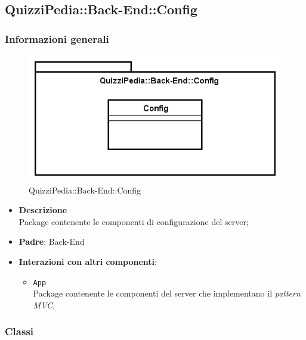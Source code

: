 \subsection{QuizziPedia::Back-End::Config}
\subsubsection{Informazioni generali}
\label{QuizziPedia::Back-End::Config}
\begin{figure}[ht]
	\centering
	\includegraphics[scale=0.45]{UML/Package/QuizziPedia_Back-End_Config.png}
	\caption{QuizziPedia::Back-End::Config}
\end{figure}
\FloatBarrier
	\begin{itemize}
		\item \textbf{Descrizione} \\
		Package contenente le componenti di configurazione del server;
		\item \textbf{Padre}: Back-End
		\item \textbf{Interazioni con altri componenti}:
			\begin{itemize}
				\item \texttt{App} \\
				Package contenente le componenti del server che implementano il \textit{pattern MVC}.
			\end{itemize}
	\end{itemize}
\subsubsection{Classi}
